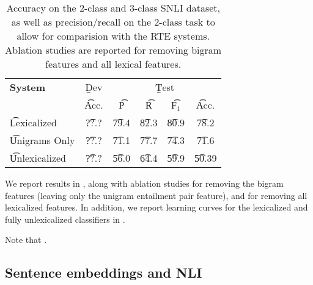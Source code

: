 \begin{table}
\begin{center}
\begin{tabular}{l@{\hskip \colspaceL}c@{\hskip \colspaceL}c@{\hskip \colspaceS}c@{\hskip \colspaceS}c@{\hskip \colspaceM}c}
\hline
\textbf{System} & \b{Dev} & \multicolumn{4}{c}{\b{Test}} \\
 & \t{Acc.} & \t{P} & \t{R} & \t{F$_1$} & \t{Acc.} \\
\hline
\t{Lexicalized}            & \t{??.?} & \t{79.4} & \t{82.3} & \t{80.9} & \t{78.2} \\
\t{Unigrams Only}          & \t{??.?} & \t{71.1} & \t{77.7} & \t{74.3} & \t{71.6} \\
\t{Unlexicalized}          & \t{??.?} & \t{56.0} & \t{64.4} & \t{59.9} & \t{50.39} \\
\hline
\end{tabular}
\end{center}
\caption{
\label{tab:bowresults}
Accuracy on the 2-class and 3-class SNLI dataset, as well as precision/recall
  on the 2-class task to allow for comparision with the RTE systems.
Ablation studies are reported for removing bigram features and all lexical
  features.
}
\end{table}
%
%


We report results in , along with ablation studies for removing
  the bigram features (leaving only the unigram entailment pair feature),
  and for removing all lexicalized features.
In addition, we report learning curves for the lexicalized and fully unlexicalized
  classifiers in .

Note that .



\subsection{Sentence embeddings and NLI}\label{sentence-embedding}

